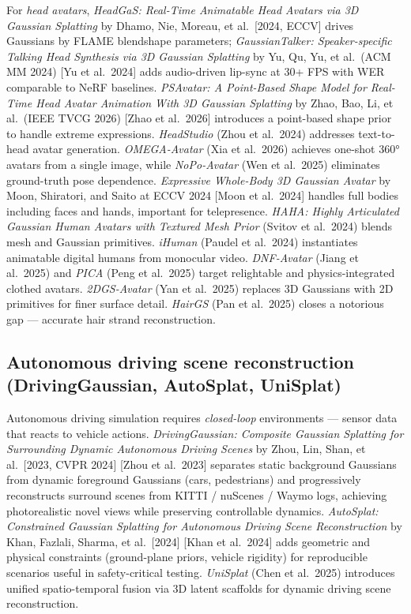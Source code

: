 For \emph{head avatars}, \emph{HeadGaS: Real-Time Animatable Head Avatars via 3D Gaussian Splatting} by Dhamo, Nie, Moreau, et al.~{[}2024, ECCV{]} drives Gaussians by FLAME blendshape parameters; \emph{GaussianTalker: Speaker-specific Talking Head Synthesis via 3D Gaussian Splatting} by Yu, Qu, Yu, et al.~(ACM MM 2024) {[}Yu et al.~2024{]} adds audio-driven lip-sync at \(30\)+ FPS with WER comparable to NeRF baselines. \emph{PSAvatar: A Point-Based Shape Model for Real-Time Head Avatar Animation With 3D Gaussian Splatting} by Zhao, Bao, Li, et al.~(IEEE TVCG 2026) {[}Zhao et al.~2026{]} introduces a point-based shape prior to handle extreme expressions. \emph{HeadStudio} (Zhou et al.~2024) addresses text-to-head avatar generation. \emph{OMEGA-Avatar} (Xia et al.~2026) achieves one-shot 360° avatars from a single image, while \emph{NoPo-Avatar} (Wen et al.~2025) eliminates ground-truth pose dependence. \emph{Expressive Whole-Body 3D Gaussian Avatar} by Moon, Shiratori, and Saito at ECCV 2024 {[}Moon et al.~2024{]} handles full bodies including faces and hands, important for telepresence. \emph{HAHA: Highly Articulated Gaussian Human Avatars with Textured Mesh Prior} (Svitov et al.~2024) blends mesh and Gaussian primitives. \emph{iHuman} (Paudel et al.~2024) instantiates animatable digital humans from monocular video. \emph{DNF-Avatar} (Jiang et al.~2025) and \emph{PICA} (Peng et al.~2025) target relightable and physics-integrated clothed avatars. \emph{2DGS-Avatar} (Yan et al.~2025) replaces 3D Gaussians with 2D primitives for finer surface detail. \emph{HairGS} (Pan et al.~2025) closes a notorious gap --- accurate hair strand reconstruction.

\subsection{Autonomous driving scene reconstruction (DrivingGaussian, AutoSplat, UniSplat)}\label{autonomous-driving-scene-reconstruction-drivinggaussian-autosplat-unisplat}

Autonomous driving simulation requires \emph{closed-loop} environments --- sensor data that reacts to vehicle actions. \emph{DrivingGaussian: Composite Gaussian Splatting for Surrounding Dynamic Autonomous Driving Scenes} by Zhou, Lin, Shan, et al.~{[}2023, CVPR 2024{]} {[}Zhou et al.~2023{]} separates static background Gaussians from dynamic foreground Gaussians (cars, pedestrians) and progressively reconstructs surround scenes from KITTI / nuScenes / Waymo logs, achieving photorealistic novel views while preserving controllable dynamics. \emph{AutoSplat: Constrained Gaussian Splatting for Autonomous Driving Scene Reconstruction} by Khan, Fazlali, Sharma, et al.~{[}2024{]} {[}Khan et al.~2024{]} adds geometric and physical constraints (ground-plane priors, vehicle rigidity) for reproducible scenarios useful in safety-critical testing. \emph{UniSplat} (Chen et al.~2025) introduces unified spatio-temporal fusion via 3D latent scaffolds for dynamic driving scene reconstruction.

